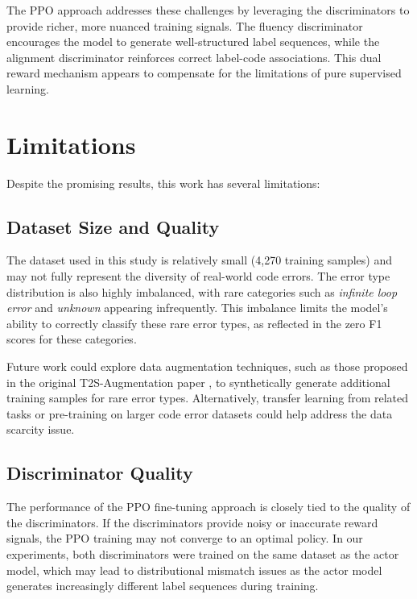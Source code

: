 The PPO approach addresses these challenges by leveraging the discriminators to provide richer, more nuanced training signals. The fluency discriminator encourages the model to generate well-structured label sequences, while the alignment discriminator reinforces correct label-code associations. This dual reward mechanism appears to compensate for the limitations of pure supervised learning.

\section{Limitations}

Despite the promising results, this work has several limitations:

\subsection{Dataset Size and Quality}

The dataset used in this study is relatively small (4,270 training samples) and may not fully represent the diversity of real-world code errors. The error type distribution is also highly imbalanced, with rare categories such as \textit{infinite loop error} and \textit{unknown} appearing infrequently. This imbalance limits the model's ability to correctly classify these rare error types, as reflected in the zero F1 scores for these categories.

Future work could explore data augmentation techniques, such as those proposed in the original T2S-Augmentation paper \cite{zhang2023target}, to synthetically generate additional training samples for rare error types. Alternatively, transfer learning from related tasks or pre-training on larger code error datasets could help address the data scarcity issue.

\subsection{Discriminator Quality}

The performance of the PPO fine-tuning approach is closely tied to the quality of the discriminators. If the discriminators provide noisy or inaccurate reward signals, the PPO training may not converge to an optimal policy. In our experiments, both discriminators were trained on the same dataset as the actor model, which may lead to distributional mismatch issues as the actor model generates increasingly different label sequences during training.


